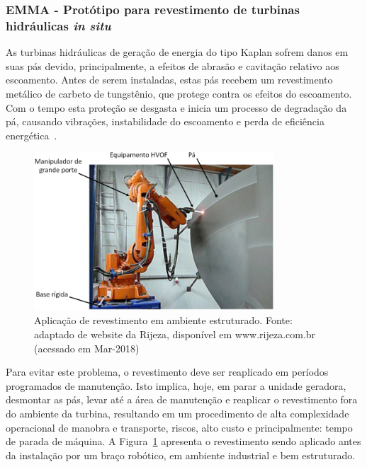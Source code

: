 \subsubsection{EMMA - Protótipo para revestimento de turbinas
hidráulicas \textit{in situ}}

As turbinas hidráulicas de geração de energia do tipo Kaplan sofrem danos em
suas pás devido, principalmente, a efeitos de abrasão e cavitação relativo aos
escoamento.
Antes de serem instaladas, estas pás recebem um revestimento metálico de carbeto
de tungstênio, que protege contra os efeitos do escoamento. Com o tempo esta
proteção se desgasta e inicia um processo de degradação da pá, causando
vibrações, instabilidade do escoamento e perda de eficiência
energética~\cite{escaler2006detection}.

\begin{figure}[h]
	\centering 
 	\includegraphics[width=0.80\textwidth]{figs/rijeza_hvof}
 	\caption[Aplicação de revestimento em ambiente industrial]{Aplicação de
 	revestimento em ambiente estruturado.
 	Fonte: adaptado de website da Rijeza, disponível em www.rijeza.com.br
 	(acessado em Mar-2018)}
 	\label{fig::rijeza_hvof}
\end{figure}

Para evitar este problema, o revestimento deve ser reaplicado em períodos
programados de manutenção. Isto implica, hoje, em parar a unidade geradora,
desmontar as pás, levar até a área de manutenção e reaplicar o revestimento fora
do ambiente da turbina, resultando em um procedimento de alta complexidade
operacional de manobra e transporte, riscos, alto custo e principalmente: tempo
de parada de máquina. A Figura~\ref{fig::rijeza_hvof}
apresenta o revestimento sendo aplicado antes da instalação por um braço
robótico, em ambiente industrial e bem estruturado.

